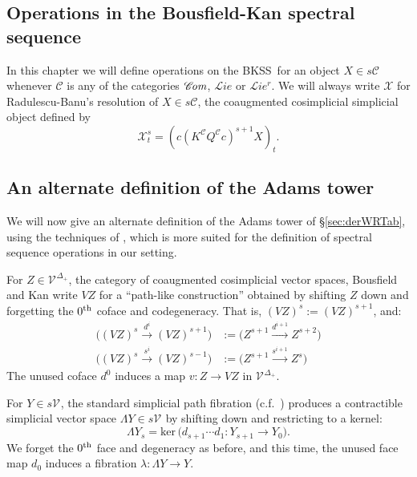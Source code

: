 \documentclass[11pt]{amsart} \renewcommand{\baselinestretch}{1.2}
\theoremstyle{plain}
\numberwithin{equation}{section} %
\theoremstyle{plain}
\numberwithin{equation}{chapter} %
\renewcommand{\ker}{\mathrm{ker}\,}
\renewcommand{\to}{\longrightarrow}
\newcommand{\scrL}{\mathscr{L}}
\newcommand{\scrC}{\mathscr{C}}
\newcommand{\calV}{\mathcal{V}}
\newcommand{\calw}{\mathcal{W}}
\newcommand{\calx}{\mathcal{X}}
\newcommand{\calc}{\mathcal{C}}
\newcommand{\citeBOX}[2][]{\cite[\mbox{#1}]{#2}}
\newcommand{\vect}[2]{\calV^{#1}_{#2}}
\newcommand{\HA}[1]{H#1}
\newcommand{\algs}{{\scrC\!\textit{\normalfont\textit{om}}}}
\newcommand{\liealgs}{{\scrL\!\textit{ie}}}
\newcommand{\restliealgs}{{\scrL\!\textit{ie}^\textit{r}}}
\newcommand{\algcat}{{\calc}}%
\newcommand{\BKSS}{BKSS}
\newcommand{\SectionOrChapter}[1]{\section{\textbf{#1}}}
\newcommand{\SubsectionOrSection}[1]{\subsection{#1}}
\begin{document}
\begin{Operations on the Bousfield-Kan spectral sequence}
\SectionOrChapter{Operations in the Bousfield-Kan spectral sequence}
\label{Operations on the Bousfield-Kan spectral sequence}
In this chapter
we will define operations on the \BKSS\ for an object $X\in s\calc$ whenever $\calc$ is any of the categories $\algs$, $\liealgs$ or $\restliealgs$. We will always write $\calx$ for Radulescu-Banu's resolution of $X\in s\algcat$, the coaugmented cosimplicial simplicial object defined by
\[\calx^s_t=(c(K^{\calc}Q^{\calc}c)^{s+1}X)_t.\]



\SubsectionOrSection{An alternate definition of the Adams tower}
\label{An alternate definition of the Adams tower}
We will now give an alternate definition of the Adams tower of \S\ref{sec:derWRTab}, using the techniques of \cite{BK_pairings_products.pdf}, which is more suited for the definition of spectral sequence operations in our setting.

For $Z\in {\vect{}{}}^{\Delta_+}$, the category of coaugmented cosimplicial vector spaces, Bousfield and Kan write $VZ$ for a ``path-like construction'' \citeBOX[\S3.1]{BK_pairings_products.pdf}  obtained by shifting $Z$ down and forgetting the $0^\textup{th}$ coface and codegeneracy. That is, $(VZ)^s:=(VZ)^{s+1}$, and:
\begin{align*}
\bigl((VZ)^s\overset{d^i}{\to} (VZ)^{s+1}\bigr)&:=\bigl(Z^{s+1}\overset{d^{i+1}}{\to} Z^{s+2}\bigr)\\
\bigl((VZ)^s\overset{s^i}{\to} (VZ)^{s-1}\bigr)&:=\bigl(Z^{s+1}\overset{s^{i+1}}{\to} Z^{s}\bigr)
\end{align*}
The unused coface $d^0$ induces a map $v:Z\to VZ$ in ${\vect{}{}}^{\Delta_+}$.

For $Y\in s\vect{}{}$, the standard simplicial path fibration (c.f.\ \citeBOX[p.~82]{BousKanSSeq.pdf}) produces a contractible simplicial vector space $\Lambda Y\in s\vect{}{}$ by shifting down and restricting to a kernel:
\[\Lambda Y_s=\ker\bigl(d_{s+1}\cdots d_1:Y_{s+1}\to Y_0\bigr).\]
We forget the $0^\textup{th}$ face and degeneracy as before, and this time, the unused face map $d_0$ induces a fibration $\lambda:\Lambda Y\to Y$.



\end{Operations on the Bousfield-Kan spectral sequence}
\end{document}
